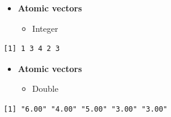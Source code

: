 \documentclass[
  ignorenonframetext,
]{beamer}
\newenvironment{Shaded}{\begin{snugshade}}{\end{snugshade}}
\newcommand{\DecValTok}[1]{\textcolor[rgb]{0.68,0.00,0.00}{#1}}
\newcommand{\FunctionTok}[1]{\textcolor[rgb]{0.28,0.35,0.67}{#1}}
\newcommand{\NormalTok}[1]{\textcolor[rgb]{0.00,0.23,0.31}{#1}}
\newcommand{\SpecialCharTok}[1]{\textcolor[rgb]{0.37,0.37,0.37}{#1}}
\newcommand{\StringTok}[1]{\textcolor[rgb]{0.13,0.47,0.30}{#1}}
\providecommand{\tightlist}{%
  \setlength{\itemsep}{0pt}\setlength{\parskip}{0pt}}\usepackage{longtable,booktabs,array}
\begin{document}
\begin{frame}[fragile]{}
\label{section-9}
\begin{itemize}
\item
  \textbf{Atomic vectors}

  \begin{itemize}
  \tightlist
  \item
    Integer
  \end{itemize}
\end{itemize}

\tiny

\begin{Shaded}
\end{Shaded}

\begin{verbatim}
[1] 1 3 4 2 3
\end{verbatim}

\normalsize

\begin{itemize}
\item
  \textbf{Atomic vectors}

  \begin{itemize}
  \tightlist
  \item
    Double
  \end{itemize}
\end{itemize}

\tiny

\begin{Shaded}
\end{Shaded}

\begin{verbatim}
[1] "6.00" "4.00" "5.00" "3.00" "3.00"
\end{verbatim}
\end{frame}
\end{document}
